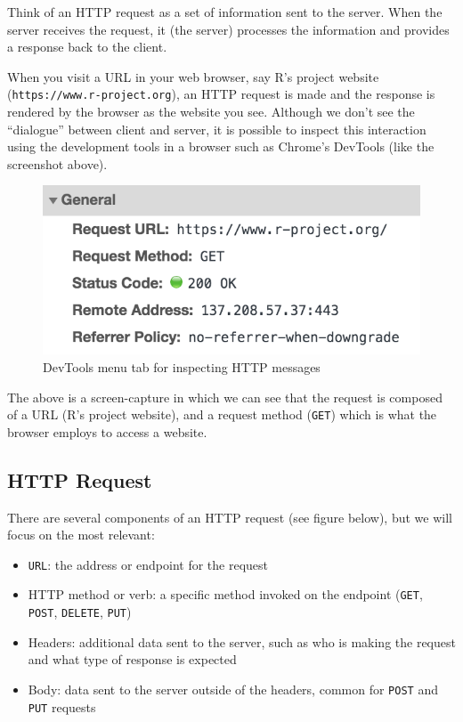 \documentclass[
]{book}
\begin{document}
Think of an HTTP request as a set of information sent to the server. When the
server receives the request, it (the server) processes the information and
provides a response back to the client.

When you visit a URL in your web browser, say R's project website
(\texttt{https://www.r-project.org}), an HTTP request is made and the response is
rendered by the browser as the website you see. Although we don't see the
``dialogue'' between client and server, it is possible to inspect this
interaction using the development tools in a browser such as Chrome's DevTools
(like the screenshot above).

\begin{figure}

{\centering \includegraphics[width=0.4\linewidth]{images/http/web-http-headers} 

}

\caption{DevTools menu tab for inspecting HTTP messages}\label{fig:unnamed-chunk-12}
\end{figure}

The above is a screen-capture in which we can see that the request is composed
of a URL (R's project website), and a request method (\texttt{GET}) which is what the
browser employs to access a website.

\hypertarget{http-request}{%
\subsection{HTTP Request}\label{http-request}}

There are several components of an HTTP request (see figure below), but we
will focus on the most relevant:

\begin{itemize}
\item
  \texttt{URL}: the address or endpoint for the request
\item
  HTTP method or verb: a specific method invoked on the endpoint
  (\texttt{GET}, \texttt{POST}, \texttt{DELETE}, \texttt{PUT})
\item
  Headers: additional data sent to the server, such as who is making the request
  and what type of response is expected
\item
  Body: data sent to the server outside of the headers, common for \texttt{POST} and
  \texttt{PUT} requests
\end{itemize}
\end{document}
